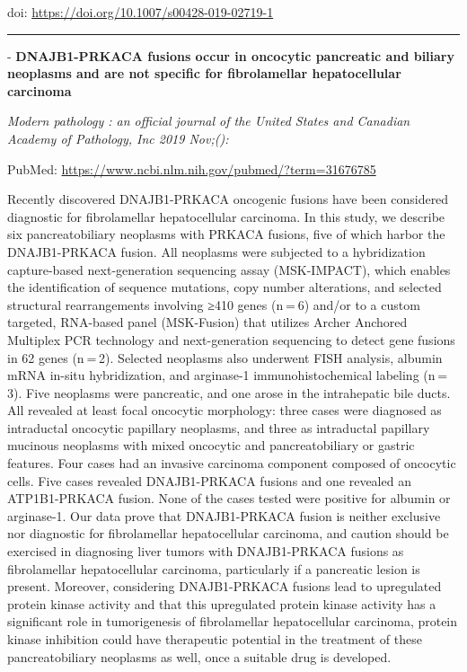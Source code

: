 \documentclass[
]{article}
\renewcommand{\linethickness}{0.05em}
\begin{document}
doi: \url{https://doi.org/10.1007/s00428-019-02719-1}

\begin{center}\rule{0.5\linewidth}{\linethickness}\end{center}

- \textbf{DNAJB1-PRKACA fusions occur in oncocytic pancreatic and
biliary neoplasms and are not specific for fibrolamellar hepatocellular
carcinoma}

\emph{Modern pathology : an official journal of the United States and
Canadian Academy of Pathology, Inc 2019 Nov;():}

PubMed: \url{https://www.ncbi.nlm.nih.gov/pubmed/?term=31676785}

Recently discovered DNAJB1-PRKACA oncogenic fusions have been considered
diagnostic for fibrolamellar hepatocellular carcinoma. In this study, we
describe six pancreatobiliary neoplasms with PRKACA fusions, five of
which harbor the DNAJB1-PRKACA fusion. All neoplasms were subjected to a
hybridization capture-based next-generation sequencing assay
(MSK-IMPACT), which enables the identification of sequence mutations,
copy number alterations, and selected structural rearrangements
involving ≥410 genes (n = 6) and/or to a custom targeted, RNA-based
panel (MSK-Fusion) that utilizes Archer Anchored Multiplex PCR
technology and next-generation sequencing to detect gene fusions in 62
genes (n = 2). Selected neoplasms also underwent FISH analysis, albumin
mRNA in-situ hybridization, and arginase-1 immunohistochemical labeling
(n = 3). Five neoplasms were pancreatic, and one arose in the
intrahepatic bile ducts. All revealed at least focal oncocytic
morphology: three cases were diagnosed as intraductal oncocytic
papillary neoplasms, and three as intraductal papillary mucinous
neoplasms with mixed oncocytic and pancreatobiliary or gastric features.
Four cases had an invasive carcinoma component composed of oncocytic
cells. Five cases revealed DNAJB1-PRKACA fusions and one revealed an
ATP1B1-PRKACA fusion. None of the cases tested were positive for albumin
or arginase-1. Our data prove that DNAJB1-PRKACA fusion is neither
exclusive nor diagnostic for fibrolamellar hepatocellular carcinoma, and
caution should be exercised in diagnosing liver tumors with
DNAJB1-PRKACA fusions as fibrolamellar hepatocellular carcinoma,
particularly if a pancreatic lesion is present. Moreover, considering
DNAJB1-PRKACA fusions lead to upregulated protein kinase activity and
that this upregulated protein kinase activity has a significant role in
tumorigenesis of fibrolamellar hepatocellular carcinoma, protein kinase
inhibition could have therapeutic potential in the treatment of these
pancreatobiliary neoplasms as well, once a suitable drug is developed.
\end{document}
